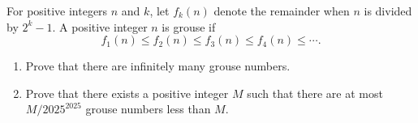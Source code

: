For positive integers $n$ and $k$, let $f_k(n)$ denote the remainder when $n$ is divided by $2^k-1$. A positive integer $n$ is grouse if
\[
f_1(n)\leq f_2(n)\leq f_3(n)\leq f_4(n)\leq\cdots.
\]
\begin{enumerate}
\item[(a)] Prove that there are infinitely many grouse numbers.
\item[(b)] Prove that there exists a positive integer $M$ such that there are at most $M/2025^{2025}$ grouse numbers less than $M$.
\end{enumerate}
